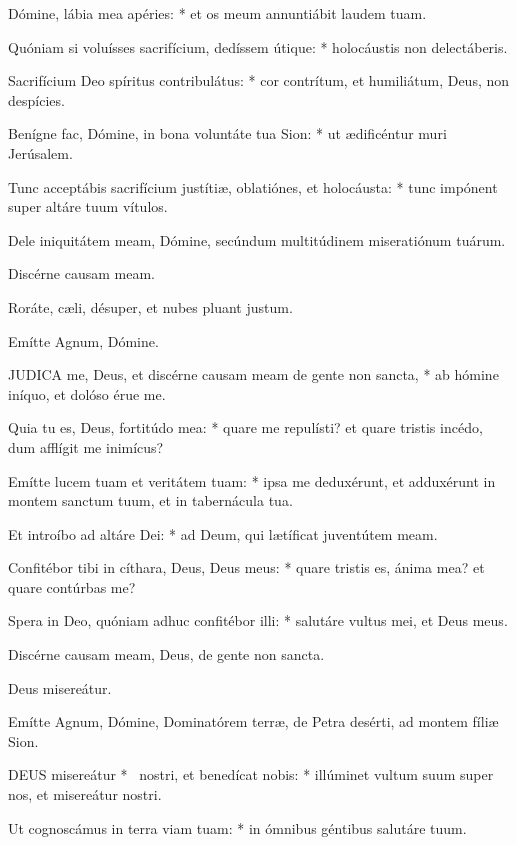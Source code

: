 Dómine, lábia mea apéries: * et os meum annuntiábit laudem tuam.

Quóniam si voluísses sacrifícium, dedíssem útique: * holocáustis non delectáberis.

Sacrifícium Deo spíritus contribulátus: * cor contrítum, et humiliátum, Deus, non despícies.

Benígne fac, Dómine, in bona voluntáte tua Sion: * ut ædificéntur muri Jerúsalem.

Tunc acceptábis sacrifícium justítiæ, oblatiónes, et holocáusta: * tunc impónent super altáre tuum vítulos.

 Dele iniquitátem meam, Dómine, secúndum multitúdinem miseratiónum tuárum.

 Discérne causam meam.

  Roráte, cæli, désuper, et nubes pluant justum.

 Emítte Agnum, Dómine.


\lettrine[lines=2]{J}{UDICA} me, Deus, et discérne causam meam de gente non sancta, * ab hómine iníquo, et dolóso érue me.

Quia tu es, Deus, fortitúdo mea: * quare me repulísti? et quare tristis incédo, dum afflígit me inimícus?

Emítte lucem tuam et veritátem tuam: * ipsa me deduxérunt, et adduxérunt in montem sanctum tuum, et in tabernácula tua.

Et introíbo ad altáre Dei: * ad Deum, qui lætíficat juventútem meam.

Confitébor tibi in cíthara, Deus, Deus meus: * quare tristis es, ánima mea? et quare contúrbas me?

Spera in Deo, quóniam adhuc confitébor illi: * salutáre vultus mei, et Deus meus.

 Discérne causam meam, Deus, de gente non sancta.

 Deus misereátur. \textdagger

  Emítte Agnum, Dómine, Dominatórem terræ, de Petra desérti, ad montem fíliæ Sion.


\lettrine[lines=2]{D}{EUS} misereátur * \textdagger\ nostri, et benedícat nobis: * illúminet vultum suum super nos, et misereátur nostri.

Ut cognoscámus in terra viam tuam: * in ómnibus géntibus salutáre tuum.

